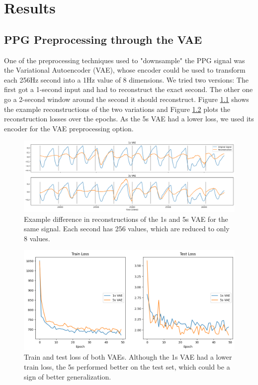 \chapter{Results \label{Chapter-Results}}

\section{PPG Preprocessing through the VAE}

One of the preprocessing techniques used to "downsample" the PPG signal was the Variational Autoencoder (VAE), whose encoder could be used to transform each 256Hz second into a 1Hz value of 8 dimensions. We tried two versions: The first got a 1-second input and had to reconstruct the exact second. The other one go a 2-second window around the second it should reconstruct. Figure \ref{fig:vaereconstruction} shows the example reconstructions of the two variations and Figure \ref{fig:vaeloss} plots the reconstruction losses over the epochs. As the 5s VAE had a lower loss, we used its encoder for the VAE preprocessing option.

\begin{figure}[h]
    \centering
    \includegraphics[width=\textwidth]{images/VaeReconstruction}
    \caption{Example difference in reconstructions of the 1s and 5s VAE for the same signal. Each second has 256 values, which are reduced to only 8 values.}
    \label{fig:vaereconstruction}
\end{figure}

\begin{figure}
    \centering
    \includegraphics[width=\textwidth]{images/VaeLoss}
    \caption{Train and test loss of both VAEs. Although the 1s VAE had a lower train loss, the 5s performed better on the test set, which could be a sign of better generalization.}
    \label{fig:vaeloss}
\end{figure}

